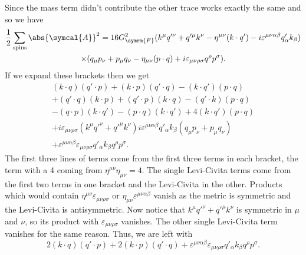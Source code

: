 \documentclass[fleqn]{NotesClass}
\newcommand{\amplitude}{\symcal{A}}
\newcommand{\minkowskiMetric}{\eta}
\newcommand{\fermiConst}{G_{\symrm{F}}}
\begin{document}
    Since the mass term didn't contribute the other trace works exactly the same and so we have
    \begin{multline}
        \frac{1}{2}\sum_{\text{spins}} \abs{\amplitude}^2 = 16 \fermiConst^2(k^\mu q'^\nu + q'^\mu k^\nu - \minkowskiMetric^{\mu\nu} (k \cdot q') - i\varepsilon^{\mu\nu\alpha\beta}q'_\alpha k_\beta)\\
        \times (q_\mu p_\nu + p_\mu q_\nu - \minkowskiMetric_{\mu\nu}(p \cdot q) + i\varepsilon_{\mu\nu\rho\sigma}q^\rho p^\sigma).
    \end{multline}
    If we expand these brackets then we get
    \begin{gather}
        (k \cdot q)(q' \cdot p) + (k \cdot p)(q' \cdot q) - (k \cdot q')(p \cdot q)\\
        + (q' \cdot q)(k \cdot p) + (q' \cdot p)(k \cdot q) - (q' \cdot k)(p \cdot q)\\
        - (q \cdot p)(k \cdot q') - (p \cdot q)(k \cdot q') + 4(k \cdot q')(p \cdot q)\\
        + i\varepsilon_{\mu\nu\rho\sigma} (k^\mu q'^\nu + q'^\mu k^\nu) i\varepsilon^{\mu\nu\alpha\beta}q'_\alpha k_\beta(q_\mu p_\nu + p_\mu q_\nu)\\
        + \varepsilon^{\mu\nu\alpha\beta}\varepsilon_{\mu\nu\rho\sigma}q'_\alpha k_\beta q^\rho p^\sigma.
    \end{gather}
    The first three lines of terms come from the first three terms in each bracket, the term with a 4 coming from \(\minkowskiMetric^{\mu\nu}\minkowskiMetric_{\mu\nu} = 4\).
    The single Levi-Civita terms come from the first two terms in one bracket and the Levi-Civita in the other.
    Products which would contain \(\minkowskiMetric^{\mu\nu}\varepsilon_{\mu\nu\rho\sigma}\) or \(\minkowskiMetric_{\mu\nu}\varepsilon^{\mu\nu\alpha\beta}\) vanish as the metric is symmetric and the Levi-Civita is antisymmetric.
    Now notice that \(k^\mu q'^\nu + q'^\mu k^\nu\) is symmetric in \(\mu\) and \(\nu\), so its product with \(\varepsilon_{\mu\nu\rho\sigma}\) vanishes.
    The other single Levi-Civita term vanishes for the same reason.
    Thus, we are left with
    \begin{equation}
        2(k \cdot q)(q' \cdot p) + 2(k \cdot p)(q' \cdot q) + \varepsilon^{\mu\nu\alpha\beta} \varepsilon_{\mu\nu\rho\sigma} q'_\alpha k_\beta q^\rho p^\sigma.
    \end{equation}
    
\end{document}
